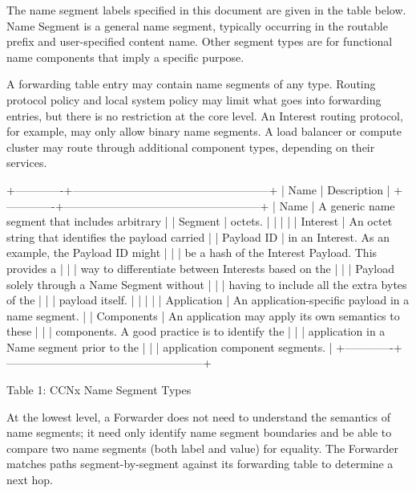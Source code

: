 \documentclass[12pt]{report}
\begin{document}
The name segment labels specified in this document are given in the
table below.  Name Segment is a general name segment, typically
occurring in the routable prefix and user-specified content name.
Other segment types are for functional name components that imply a
specific purpose.

A forwarding table entry may contain name segments of any type.
Routing protocol policy and local system policy may limit what goes
into forwarding entries, but there is no restriction at the core
level.  An Interest routing protocol, for example, may only allow
binary name segments.  A load balancer or compute cluster may route
through additional component types, depending on their services.

+-------------+-----------------------------------------------------+
|     Name    | Description                                         |
+-------------+-----------------------------------------------------+
|     Name    | A generic name segment that includes arbitrary      |
|   Segment   | octets.                                             |
|             |                                                     |
|   Interest  | An octet string that identifies the payload carried |
|  Payload ID | in an Interest. As an example, the Payload ID might |
|             | be a hash of the Interest Payload.  This provides a |
|             | way to differentiate between Interests based on the |
|             | Payload solely through a Name Segment without       |
|             | having to include all the extra bytes of the        |
|             | payload itself.                                     |
|             |                                                     |
| Application | An application-specific payload in a name segment.  |
|  Components | An application may apply its own semantics to these |
|             | components.  A good practice is to identify the     |
|             | application in a Name segment prior to the          |
|             | application component segments.                     |
+-------------+-----------------------------------------------------+

                 Table 1: CCNx Name Segment Types

At the lowest level, a Forwarder does not need to understand the
semantics of name segments; it need only identify name segment
boundaries and be able to compare two name segments (both label and
value) for equality.  The Forwarder matches paths segment-by-segment
against its forwarding table to determine a next hop.
\end{document}
